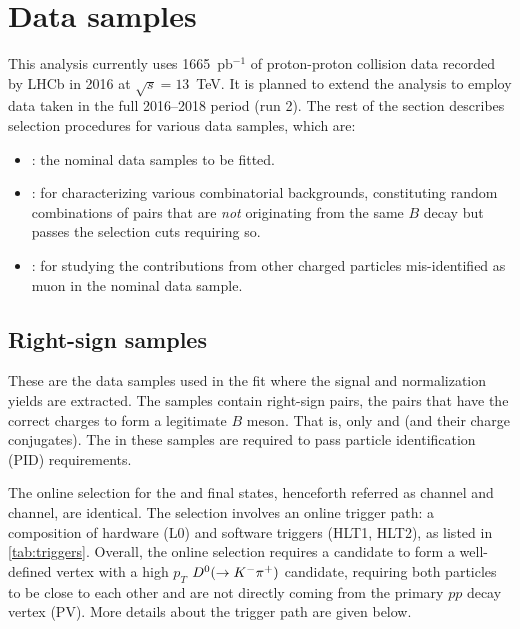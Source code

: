 \section{Data samples}
\label{ref:sel:data}

This analysis currently uses 1665~pb$^{-1}$ of proton-proton collision data
recorded by LHCb in 2016 at $\sqrt{s} = 13$~TeV.
It is planned to extend the analysis to employ data taken in the full
2016--2018 period (run 2).
The rest of the section describes selection procedures for various data samples,
which are:

\begin{itemize}
    \item {}:
        the nominal data samples to be fitted.
    \item {}:
        for characterizing various combinatorial backgrounds,
        constituting random combinations of \DXmu pairs that are \emph{not}
        originating from the same $B$ decay but passes the selection cuts
        requiring so.
    \item {}:
        for studying the contributions from other charged particles
        mis-identified as muon in the nominal data sample.
\end{itemize}


\subsection{Right-sign samples}
\label{ref:sel:data:rs}

These are the data samples used in the fit where the signal and normalization
yields are extracted.
The samples contain right-sign \DXmu pairs,
the pairs that have the correct charges to form a legitimate $B$ meson.
That is, only \Dz\mun and \Dstarp\mun (and their charge conjugates).
The \muon in these samples are required to pass \muon particle identification
(PID) requirements.

The online selection for the \Dz\mun and \Dstarp\mun final states,
henceforth referred as \Dz channel and \Dstar channel,
are identical.
The selection involves an online trigger path:
a composition of hardware (L0) and software triggers (HLT1, HLT2),
as listed in \cref{tab:triggers}.
Overall, the online selection requires a \muon candidate to form
a well-defined vertex
with a high $p_T$ ${{D}^0} (\rightarrow {\ensuremath{{K}^-}} {\ensuremath{{\pi}^+}})$ candidate,
requiring both particles to be close to each other and are not directly coming
from the primary $pp$ decay vertex (PV).
More details about the trigger path are given below.


